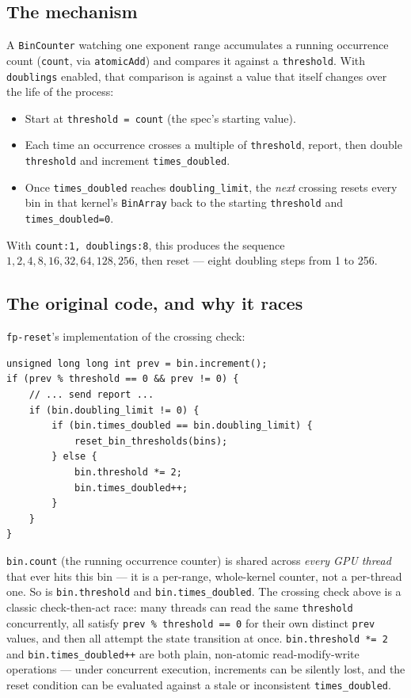 \documentclass[11pt]{article}
\begin{document}
\subsection{The mechanism}

A \texttt{BinCounter} watching one exponent range accumulates a running occurrence
count (\texttt{count}, via \texttt{atomicAdd}) and compares it against a
\texttt{threshold}. With \texttt{doublings} enabled, that comparison is against a value
that itself changes over the life of the process:
\begin{itemize}
\item Start at \texttt{threshold = count} (the spec's starting value).
\item Each time an occurrence crosses a multiple of \texttt{threshold}, report, then
  double \texttt{threshold} and increment \texttt{times\_doubled}.
\item Once \texttt{times\_doubled} reaches \texttt{doubling\_limit}, the \emph{next}
  crossing resets every bin in that kernel's \texttt{BinArray} back to the starting
  \texttt{threshold} and \texttt{times\_doubled=0}.
\end{itemize}
With \texttt{count:1, doublings:8}, this produces the sequence
$1,2,4,8,16,32,64,128,256$, then reset --- eight doubling steps from 1 to 256.

\subsection{The original code, and why it races}

\texttt{fp-reset}'s implementation of the crossing check:
\begin{lstlisting}
unsigned long long int prev = bin.increment();
if (prev % threshold == 0 && prev != 0) {
    // ... send report ...
    if (bin.doubling_limit != 0) {
        if (bin.times_doubled == bin.doubling_limit) {
            reset_bin_thresholds(bins);
        } else {
            bin.threshold *= 2;
            bin.times_doubled++;
        }
    }
}
\end{lstlisting}
\texttt{bin.count} (the running occurrence counter) is shared across \emph{every GPU
thread} that ever hits this bin --- it is a per-range, whole-kernel counter, not a
per-thread one. So is \texttt{bin.threshold} and \texttt{bin.times\_doubled}. The crossing
check above is a classic check-then-act race: many threads can read the same
\texttt{threshold} concurrently, all satisfy \texttt{prev \% threshold == 0} for their own
distinct \texttt{prev} values, and then all attempt the state transition at once.
\texttt{bin.threshold *= 2} and \texttt{bin.times\_doubled++} are both plain,
non-atomic read-modify-write operations --- under concurrent execution, increments can
be silently lost, and the reset condition can be evaluated against a stale or
inconsistent \texttt{times\_doubled}.
\end{document}
